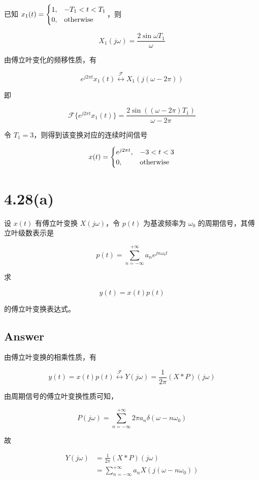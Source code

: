 \documentclass[11pt]{article}
\begin{document}
已知
\(x_1(t) = \begin{cases} 1, & -T_1 < t < T_1 \\ 0, & \rm other wise\end{cases}\)，则

\[
X_1(j\omega) = \frac{2\sin \omega T_1}{\omega}
\]

由傅立叶变化的频移性质，有

\[
e^{j2\pi t}x_1(t) \stackrel{\mathcal{F}}{\longleftrightarrow} X_1(j(\omega-2\pi))
\]

即

\[
\mathcal{F}\{ e^{j2\pi t}x_1(t) \} = \frac{2\sin((\omega - 2\pi) T_1)}{\omega - 2\pi}
\]

令 \(T_1 = 3\)，则得到该变换对应的连续时间信号

\[
x(t) = \begin{cases}
e^{j2\pi t}, & -3 < t < 3 \\
0, & \rm otherwise
\end{cases}
\]

    \section{4.28(a)}\label{a}

设 \(x(t)\) 有傅立叶变换 \(X(j\omega)\)，令 \(p(t)\) 为基波频率为
\(\omega_0\) 的周期信号，其傅立叶级数表示是

\[
p(t) = \sum_{n = -\infty}^{+\infty}a_ne^{jn\omega_0t}
\]

求

\[
y(t) = x(t)p(t)
\]

的傅立叶变换表达式。

\subsection{Answer}\label{answer}

由傅立叶变换的相乘性质，有

\[
y(t)=x(t)p(t) \stackrel{\mathcal{F}}{\longleftrightarrow} Y(j\omega)=\frac{1}{2\pi}(X*P)(j\omega)
\]

由周期信号的傅立叶变换性质可知，

\[
P(j\omega) = \sum_{n = -\infty}^{+\infty}2\pi a_n\delta(\omega - n\omega_0)
\]

故

\[
\boxed{
\begin{aligned}
Y(j\omega) &= \frac{1}{2\pi}(X*P)(j\omega) \\
&= \sum_{n = -\infty}^{+\infty}a_nX(j(\omega - n\omega_0))
\end{aligned}}
\]
\end{document}
